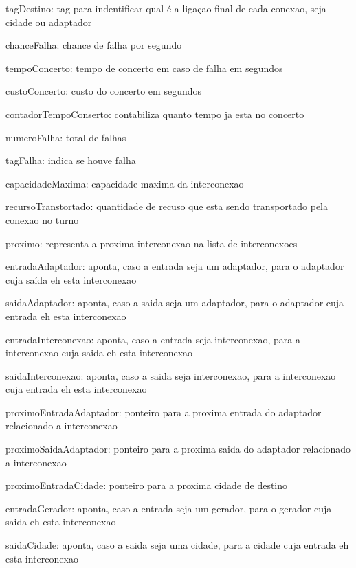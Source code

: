 tag\-Destino\-: tag para indentificar qual é a ligaçao final de cada conexao, seja cidade ou adaptador

chance\-Falha\-: chance de falha por segundo

tempo\-Concerto\-: tempo de concerto em caso de falha em segundos

custo\-Concerto\-: custo do concerto em segundos

contador\-Tempo\-Conserto\-: contabiliza quanto tempo ja esta no concerto

numero\-Falha\-: total de falhas

tag\-Falha\-: indica se houve falha

capacidade\-Maxima\-: capacidade maxima da interconexao

recurso\-Transtortado\-: quantidade de recuso que esta sendo transportado pela conexao no turno

proximo\-: representa a proxima interconexao na lista de interconexoes

entrada\-Adaptador\-: aponta, caso a entrada seja um adaptador, para o adaptador cuja saída eh esta interconexao

saida\-Adaptador\-: aponta, caso a saida seja um adaptador, para o adaptador cuja entrada eh esta interconexao

entrada\-Interconexao\-: aponta, caso a entrada seja interconexao, para a interconexao cuja saida eh esta interconexao

saida\-Interconexao\-: aponta, caso a saida seja interconexao, para a interconexao cuja entrada eh esta interconexao

proximo\-Entrada\-Adaptador\-: ponteiro para a proxima entrada do adaptador relacionado a interconexao

proximo\-Saida\-Adaptador\-: ponteiro para a proxima saida do adaptador relacionado a interconexao

proximo\-Entrada\-Cidade\-: ponteiro para a proxima cidade de destino

entrada\-Gerador\-: aponta, caso a entrada seja um gerador, para o gerador cuja saida eh esta interconexao

saida\-Cidade\-: aponta, caso a saida seja uma cidade, para a cidade cuja entrada eh esta interconexao 

